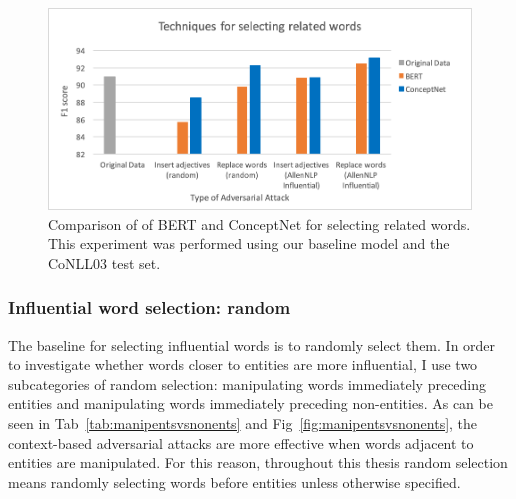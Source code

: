  \begin{figure}[h]
	\centering
	\includegraphics[width=0.85\linewidth]{LatexDiss/figures/relatedwords.png}
	\caption{Comparison of of BERT and ConceptNet for selecting related words. This experiment was performed using our baseline model and the CoNLL03 test set.}
	\label{fig:relatedwords}
\end{figure}


\subsubsection{Influential word selection: random}
\label{sec:randomselection}
The baseline for selecting influential words is to randomly select them. In order to investigate whether words closer to entities are more influential, I use two subcategories of random selection: manipulating words immediately preceding entities and manipulating words immediately preceding non-entities. As can be seen in Tab~\ref{tab:manipentsvsnonents} and Fig~\ref{fig:manipentsvsnonents}, the context-based adversarial attacks are more effective when words adjacent to entities are manipulated. For this reason, throughout this thesis random selection means randomly selecting words before entities unless otherwise specified.

